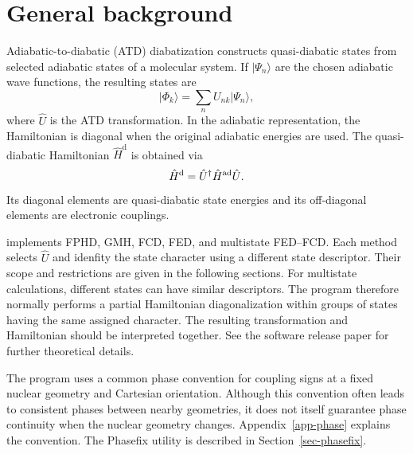 \section{General background}\label{sec-diabat-common}
Adiabatic-to-diabatic (ATD) diabatization constructs quasi-diabatic states from selected adiabatic states of a molecular system. If \(\lvert\Psi_n\rangle\) are the chosen adiabatic wave functions, the resulting states are
\begin{equation}
\lvert\Phi_k\rangle=\sum_n U_{nk}\lvert\Psi_n\rangle,
\end{equation}
where $\hat{U}$ is the ATD transformation. In the adiabatic representation, the Hamiltonian is diagonal when the original adiabatic energies are used. The quasi-diabatic Hamiltonian $\hat{H}^{\mathrm{d}}$ is obtained via
\begin{equation}
\hat{H}^{\rm d}=\hat{U}^{\dagger}\hat{H}^{\rm ad}\hat{U}.
\end{equation}
Its diagonal elements are quasi-diabatic state energies and its off-diagonal elements are electronic couplings.

\progname{} implements FPHD, GMH, FCD, FED, and multistate FED--FCD. Each method selects $\hat{U}$ and idenfity the state character using a different state descriptor. Their scope and restrictions are given in the following sections. For multistate calculations, different states can have similar descriptors. The program therefore normally performs a partial Hamiltonian diagonalization within groups of states having the same assigned character. The resulting transformation and Hamiltonian should be interpreted together.
See the software release paper\cite{Diabat2026} for further theoretical details.

The program uses a common phase convention for coupling signs at a fixed nuclear geometry and Cartesian orientation.
Although this convention often leads to consistent phases between nearby geometries, it does not itself guarantee phase continuity when the nuclear geometry changes.
 Appendix~\ref{app-phase} explains the convention.
 The Phasefix utility is described in Section~\ref{sec-phasefix}.